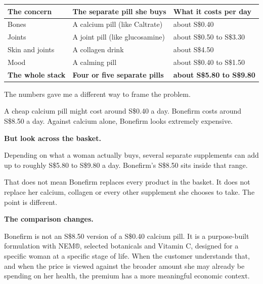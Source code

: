 \documentclass[10pt,twoside,openany]{memoir}
\renewcommand{\arraystretch}{1.1}
\begin{document}
{\def\LTcaptype{none} %
{\renewcommand{\arraystretch}{0.9}\begin{longtable}[]{@{}
  >{\raggedright\arraybackslash}p{}
  >{\raggedright\arraybackslash}p{}
  >{\raggedright\arraybackslash}p{}@{}}
\toprule\noalign{}
\begin{minipage}[b]{\linewidth}\raggedright
The concern
\end{minipage} & \begin{minipage}[b]{\linewidth}\raggedright
The separate pill she buys
\end{minipage} & \begin{minipage}[b]{\linewidth}\raggedright
What it costs per day
\end{minipage} \\
\midrule\noalign{}
\endhead
\bottomrule\noalign{}
\endlastfoot
Bones & A calcium pill (like Caltrate) & about S\$0.40 \\
Joints & A joint pill (like glucosamine) & about S\$0.50 to S\$3.30 \\
Skin and joints & A collagen drink & about S\$4.50 \\
Mood & A calming pill & about S\$0.40 to S\$1.50 \\
\textbf{The whole stack} & \textbf{Four or five separate pills} &
\textbf{about S\$5.80 to S\$9.80} \\
\end{longtable}
}

The numbers gave me a different way to frame the problem.

A cheap calcium pill might cost around S\$0.40 a day. Bonefirm costs
around S\$8.50 a day. Against calcium alone, Bonefirm looks extremely
expensive.

\textbf{But look across the basket.}

Depending on what a woman actually buys, several separate supplements
can add up to roughly S\$5.80 to S\$9.80 a day. Bonefirm's S\$8.50 sits
inside that range.

That does not mean Bonefirm replaces every product in the basket. It
does not replace her calcium, collagen or every other supplement she
chooses to take. The point is different.

\textbf{The comparison changes.}

Bonefirm is not an S\$8.50 version of a S\$0.40 calcium pill. It is a
purpose-built formulation with NEM®, selected botanicals and Vitamin C,
designed for a specific woman at a specific stage of life. When the
customer understands that, and when the price is viewed against the
broader amount she may already be spending on her health, the premium
has a more meaningful economic context.

}
\end{document}

